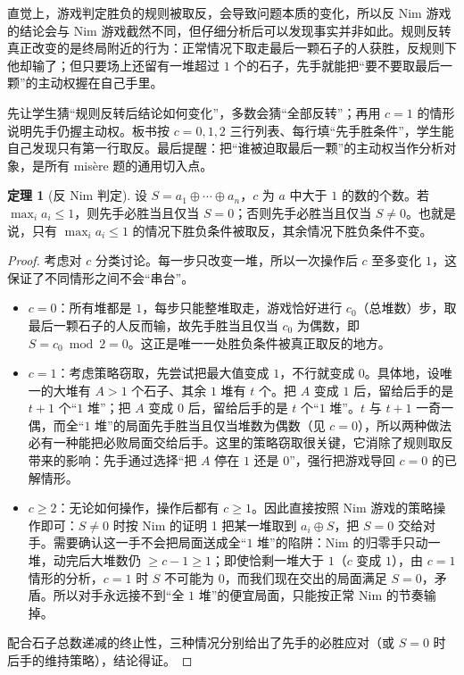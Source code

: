 \documentclass[UTF8,a4paper,11pt,oneside,openany,fontset=fandol]{ctexbook}
\theoremstyle{definition}
\newtheorem{theorem}[definition]{定理}
\begin{document}
直觉上，游戏判定胜负的规则被取反，会导致问题本质的变化，所以反 Nim 游戏的结论会与 Nim 游戏截然不同，但仔细分析后可以发现事实并非如此。规则反转真正改变的是终局附近的行为：正常情况下取走最后一颗石子的人获胜，反规则下他却输了；但只要场上还留有一堆超过 $1$ 个的石子，先手就能把“要不要取最后一颗”的主动权握在自己手里。

\begin{teach}[反规则题的教学顺序]
先让学生猜“规则反转后结论如何变化”，多数会猜“全部反转”；再用 $c=1$ 的情形说明先手仍握主动权。板书按 $c=0,1,2$ 三行列表、每行填“先手胜条件”，学生能自己发现只有第一行取反。最后提醒：把“谁被迫取最后一颗”的主动权当作分析对象，是所有 misère 题的通用切入点。
\end{teach}
\begin{theorem}[反 Nim 判定]\label{thm:antinim}
设 $S=a_1\oplus\cdots\oplus a_n$，$c$ 为 $a$ 中大于 $1$ 的数的个数。若 $\max_i a_i\le1$，则先手必胜当且仅当 $S=0$；否则先手必胜当且仅当 $S\ne0$。也就是说，只有 $\max_i a_i\le1$ 的情况下胜负条件被取反，其余情况下胜负条件不变。
\end{theorem}
\begin{proof}
考虑对 $c$ 分类讨论。每一步只改变一堆，所以一次操作后 $c$ 至多变化 $1$，这保证了不同情形之间不会“串台”。
\begin{itemize}
\item $c=0$：所有堆都是 $1$，每步只能整堆取走，游戏恰好进行 $c_0$（总堆数）步，取最后一颗石子的人反而输，故先手胜当且仅当 $c_0$ 为偶数，即 $S=c_0\bmod 2=0$。这正是唯一一处胜负条件被真正取反的地方。
\item $c=1$：考虑策略窃取，先尝试把最大值变成 $1$，不行就变成 $0$。具体地，设唯一的大堆有 $A>1$ 个石子、其余 $1$ 堆有 $t$ 个。把 $A$ 变成 $1$ 后，留给后手的是 $t+1$ 个“$1$ 堆”；把 $A$ 变成 $0$ 后，留给后手的是 $t$ 个“$1$ 堆”。$t$ 与 $t+1$ 一奇一偶，而全“$1$ 堆”的局面先手胜当且仅当堆数为偶数（见 $c=0$），所以两种做法必有一种能把必败局面交给后手。这里的策略窃取很关键，它消除了规则取反带来的影响：先手通过选择“把 $A$ 停在 $1$ 还是 $0$”，强行把游戏导回 $c=0$ 的已解情形。
\item $c\ge2$：无论如何操作，操作后都有 $c\ge1$。因此直接按照 Nim 游戏的策略操作即可：$S\ne0$ 时按 Nim 的证明 1 把某一堆取到 $a_i\oplus S$，把 $S=0$ 交给对手。需要确认这一手不会把局面送成全“$1$ 堆”的陷阱：Nim 的归零手只动一堆，动完后大堆数仍 $\ge c-1\ge1$；即使恰剩一堆大于 $1$（$c$ 变成 $1$），由 $c=1$ 情形的分析，$c=1$ 时 $S$ 不可能为 $0$，而我们现在交出的局面满足 $S=0$，矛盾。所以对手永远接不到“全 $1$ 堆”的便宜局面，只能按正常 Nim 的节奏输掉。
\end{itemize}
配合石子总数递减的终止性，三种情况分别给出了先手的必胜应对（或 $S=0$ 时后手的维持策略），结论得证。
\end{proof}
\end{document}
